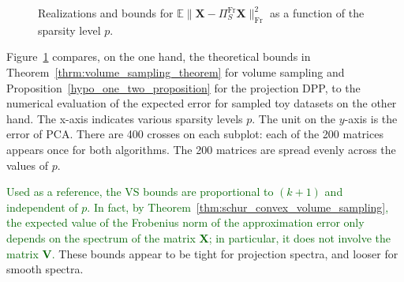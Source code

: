 \documentclass[twoside,11pt]{book}
\newcommand{\rev}[1]{\textcolor{darkgreen}{#1}}
\numberwithin{theorem}{chapter}
\numberwithin{definition}{chapter}
\numberwithin{proposition}{chapter}
\numberwithin{corollary}{chapter}
\numberwithin{example}{chapter}
\numberwithin{lemma}{chapter}
\numberwithin{assumption}{chapter}
\DeclareMathOperator{\Fr}{\mathrm{Fr}}
\begin{document}
\begin{figure}
 \setcounter{subfigure}{2}%
 \setcounter{subfigure}{5}%

\caption{Realizations and bounds for $\mathbb{E} \|\bm{X}- \Pi_{S}^{\Fr} \bm{X}\|_{\Fr}^{2}$ as a function of the sparsity level $p$. \label{fig:toydatasets_vs_dpp_comparison_0}}
\end{figure}


Figure~\ref{fig:toydatasets_vs_dpp_comparison_0} compares, on the one hand, the theoretical bounds in Theorem~\ref{thrm:volume_sampling_theorem} for volume sampling and Proposition~\ref{hypo_one_two_proposition} for the projection DPP, to the numerical evaluation of the expected error for sampled toy datasets on the other hand. The x-axis indicates various sparsity levels $p$. The unit on the $y$-axis is the error of PCA. There are 400 crosses on each subplot: each of the 200 matrices appears once for both algorithms. The 200 matrices are spread evenly across the values of $p$.

\rev{Used as a reference, the VS bounds are proportional to $(k+1)$ and independent of $p$. In fact, by Theorem~\ref{thm:schur_convex_volume_sampling}, the expected value of the Frobenius norm of the approximation error only depends on the spectrum of the matrix $\bm{X}$; in particular, it does not involve the matrix $\bm{V}$.} These bounds appear to be tight for projection spectra, and looser for smooth spectra.
\end{document}

